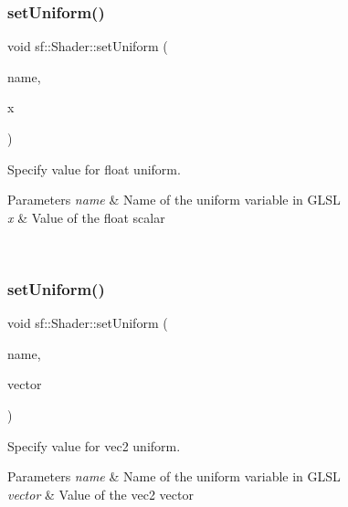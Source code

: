 \subsubsection{\texorpdfstring{setUniform()}{setUniform()}\hspace{0.1cm}{\footnotesize\ttfamily [1/16]}}
{\footnotesize\ttfamily void sf\+::\+Shader\+::set\+Uniform (\begin{DoxyParamCaption}\item[{const std\+::string \&}]{name,  }\item[{float}]{x }\end{DoxyParamCaption})}



Specify value for {\ttfamily float} uniform. 


\begin{DoxyParams}{Parameters}
{\em name} & Name of the uniform variable in G\+L\+SL \\
\hline
{\em x} & Value of the float scalar \begin{DoxyVerb}\end{DoxyVerb}
 \\
\hline
\end{DoxyParams}
\mbox{\label{classsf_1_1_shader_a4a2c673c41e37b17d67e4af1298b679f}} 
\subsubsection{\texorpdfstring{setUniform()}{setUniform()}\hspace{0.1cm}{\footnotesize\ttfamily [2/16]}}
{\footnotesize\ttfamily void sf\+::\+Shader\+::set\+Uniform (\begin{DoxyParamCaption}\item[{const std\+::string \&}]{name,  }\item[{const \mbox{\hyperlink{namespacesf_1_1_glsl_adeed356d346d87634b4c197a530e4edf}{Glsl\+::\+Vec2}} \&}]{vector }\end{DoxyParamCaption})}



Specify value for {\ttfamily vec2} uniform. 


\begin{DoxyParams}{Parameters}
{\em name} & Name of the uniform variable in G\+L\+SL \\
\hline
{\em vector} & Value of the vec2 vector \begin{DoxyVerb}\end{DoxyVerb}
 \\
\hline
\end{DoxyParams}
\mbox{\label{classsf_1_1_shader_aad654ad8de6f0c56191fa7b8cea21db2}} 
